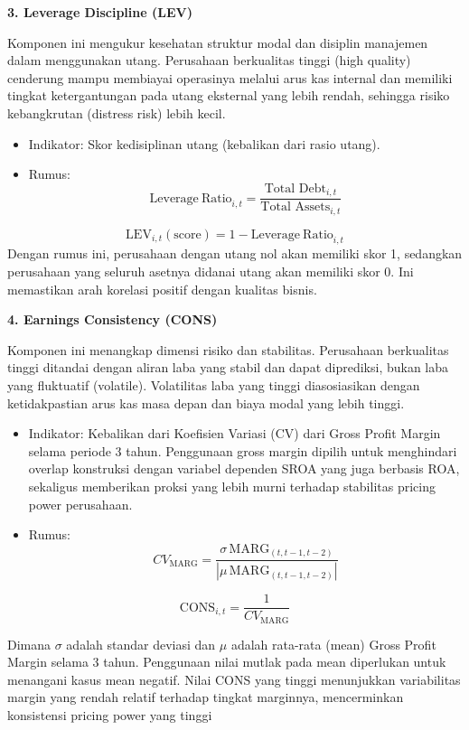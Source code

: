\documentclass[12pt,a4paper]{report}
\providecommand{\tightlist}{%
  \setlength{\itemsep}{0pt}\setlength{\parskip}{0pt}%
}
\begin{document}
\textbf{3. Leverage Discipline (LEV)}

Komponen ini mengukur kesehatan struktur modal dan disiplin manajemen
dalam menggunakan utang. Perusahaan berkualitas tinggi (high quality)
cenderung mampu membiayai operasinya melalui arus kas internal dan
memiliki tingkat ketergantungan pada utang eksternal yang lebih rendah,
sehingga risiko kebangkrutan (distress risk) lebih kecil.

\begin{itemize}
\tightlist
\item
  Indikator: Skor kedisiplinan utang (kebalikan dari rasio utang).
\item
  Rumus: \[
  \mathrm{Leverage\ Ratio}_{i,t} = \frac{\text{Total Debt}_{i,t}}{\text{Total Assets}_{i,t}}
  \]
\end{itemize}

\[
\mathrm{LEV}_{i,t}(\text{score}) = 1 - \mathrm{Leverage\ Ratio}_{i,t}
\] Dengan rumus ini, perusahaan dengan utang nol akan memiliki skor 1,
sedangkan perusahaan yang seluruh asetnya didanai utang akan memiliki
skor 0. Ini memastikan arah korelasi positif dengan kualitas bisnis.

\textbf{4. Earnings Consistency (CONS)}

Komponen ini menangkap dimensi risiko dan stabilitas. Perusahaan
berkualitas tinggi ditandai dengan aliran laba yang stabil dan dapat
diprediksi, bukan laba yang fluktuatif (volatile). Volatilitas laba yang
tinggi diasosiasikan dengan ketidakpastian arus kas masa depan dan biaya
modal yang lebih tinggi.

\begin{itemize}
\tightlist
\item
  Indikator: Kebalikan dari Koefisien Variasi (CV) dari Gross Profit
  Margin selama periode 3 tahun. Penggunaan gross margin dipilih untuk
  menghindari overlap konstruksi dengan variabel dependen SROA yang juga
  berbasis ROA, sekaligus memberikan proksi yang lebih murni terhadap
  stabilitas pricing power perusahaan.
\item
  Rumus: \[
  CV_{\mathrm{MARG}} = \frac{\sigma\, \mathrm{MARG}_{(t,t-1,t-2)}}{|\mu\, \mathrm{MARG}_{(t,t-1,t-2)}|}
  \]
\end{itemize}

\[
\mathrm{CONS}_{i,t} = \frac{1}{CV_{\mathrm{MARG}}}
\]

Dimana \(\sigma\) adalah standar deviasi dan \(\mu\) adalah rata-rata
(mean) Gross Profit Margin selama 3 tahun. Penggunaan nilai mutlak pada
mean diperlukan untuk menangani kasus mean negatif. Nilai CONS yang
tinggi menunjukkan variabilitas margin yang rendah relatif terhadap
tingkat marginnya, mencerminkan konsistensi pricing power yang tinggi
\end{document}
